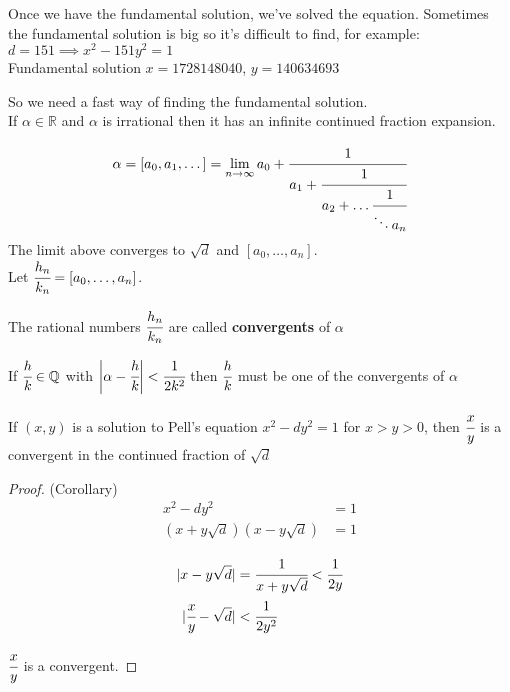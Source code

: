 \documentclass[11pt]{article}
\begin{document}
Once we have the fundamental solution, we've solved the equation. Sometimes the fundamental solution is big so it's difficult to find, for example:\\

$d=151 \implies x^2- 151 y^2 =1$\\

Fundamental solution $x=1728148040$, $y=140634693$

So we need a fast way of finding the fundamental solution.\\[1em]

If $\alpha \in \mathbb{R} $ and $\alpha $ is irrational then it has an infinite continued fraction expansion.

\begin{align*}
	\alpha = [a_0,a_1,\dots] = \lim_{n \rightarrow \infty }  a_0 + \cfrac{1}{a_1 + \cfrac{1}{a_2 +\dots \cfrac{1}{\ddots a_n}}} 
\end{align*}
The limit above converges to $\sqrt{d} $ and $[a_0,\dots,a_n]$.\\[1em]
$ $\\
Let $\cfrac{h_n}{k_n} = [a_0,\dots,a_n]$.


\begin{definition}
	The rational numbers $\cfrac{h_n}{k_n}$ are called \textbf{convergents} of $\alpha$
\end{definition}


\begin{theorem}
	If $\cfrac{h}{k} \in \mathbb{Q} $ with $\bigg| \alpha - \cfrac{h}{k} \bigg| < \cfrac{1}{2k^2}$ then $\cfrac{h}{k}$ must be one of the convergents of $\alpha$
\end{theorem}



\begin{corollary}
	If $(x,y)$ is a solution to Pell's equation $x^2 -dy^2 = 1$ for $x>y>0$, then $\cfrac{x}{y}$ is a convergent in the continued fraction of $\sqrt{d}$
\end{corollary}




\begin{proof} (Corollary)
	\begin{align*}
		x^2-dy^2 &=1\\
	(x+y\sqrt{d})(x-y\sqrt{d})&=1\\
	\end{align*}
	\vspace{-30pt}
	\begin{align*}
		|x-y\sqrt{d}|&= \cfrac{1}{x+y\sqrt{d}} < \cfrac{1}{2y}\\
		|\cfrac{x}{y} - \sqrt{d} | &< \cfrac{1}{2y^2}
	\end{align*}

	$\cfrac{x}{y} $ is a convergent.
\end{proof}
\end{document}
